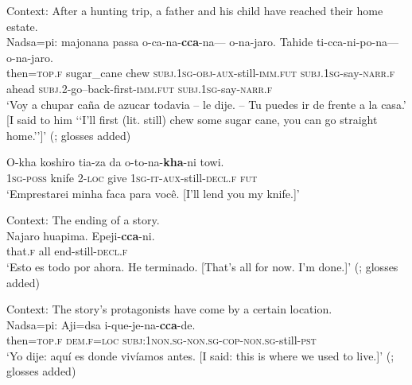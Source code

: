 \begin{exe}
	\ex\label{exAppendixCulinaFirst1}
	 Context: After a hunting trip, a father and his child have reached their home estate.\\
	\gll Nadsa=pi: majonana passa o-ca-na-\textbf{cca}-na---  o-na-jaro. Tahide ti-cca-ni-po-na--- o-na-jaro.\\
	then=\textsc{top}.\textsc{f} sugar\_cane chew \textsc{subj}.1\textsc{sg}-\textsc{obj}-\textsc{aux}-still-\textsc{imm}.\textsc{fut}  \textsc{subj}.1\textsc{sg}-say-\textsc{narr}.\textsc{f}  ahead \textsc{subj}.2-go--back-first-\textsc{imm}.\textsc{fut} \textsc{subj}.1\textsc{sg}-say-\textsc{narr}.\textsc{f}\\
	 \lq Voy a chupar caña de azucar todavia – le dije. – Tu puedes ir de frente a la casa.' [I said to him \lq\lq I'll first (lit. still) chew some sugar cane, you can go straight home.\rq\rq]\rq{ }(\cite[92–93]{Boyer1990}; glosses added)
	
	\ex\label{exAppendixKulinaForNow1}
	\gll O-kha koshiro tia-za da o-to-na-\textbf{kha}-ni towi.\\
	1\textsc{sg}-\textsc{poss} knife 2-\textsc{loc} give 1\textsc{sg}-\textsc{it}-\textsc{aux}-still-\textsc{decl}.\textsc{f} \textsc{fut}\\
	\glt \lq Emprestarei minha faca para você. [I'll lend you my knife.]\rq{ }\parencite[185]{Tiss2004}

	\ex\label{exAppendixKulinaForNow2}
	 Context: The ending of a story.\\
	\gll Najaro huapima. Epeji-\textbf{cca}-ni.\\
	that.\textsc{f} all end-still-\textsc{decl}.\textsc{f} \\
	\glt \lq Esto es todo por ahora. He terminado. [That's all for now. I'm done.]\rq{ }(\cite[67]{AgnewAdams1992}; glosses added)	
	
	\ex\label{exAppendixCulinaFirst2}
	Context: The story's protagonists have come by a certain location.\\
	\gll Nadsa=pi: Aji=dsa i-que-je-na-\textbf{cca}-de.\\
	then=\textsc{top}.\textsc{f} \textsc{dem}.\textsc{f}=\textsc{loc} \textsc{subj}:1\textsc{non}.\textsc{sg}-\textsc{non}.\textsc{sg}-\textsc{cop}-\textsc{non}.\textsc{sg}-still-\textsc{pst}\\
	\glt \lq Yo dije: aquí es donde vivíamos antes. [I said: this is where we used to live.]\rq{ }(\cite[88–89]{Boyer1990}; glosses added)
\end{exe}


